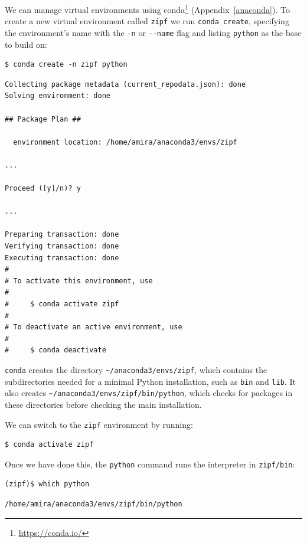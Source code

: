 \documentclass[
]{krantz}
\renewcommand{\href}[2]{#2\footnote{\url{#1}}}
\begin{document}
We can manage virtual environments using \href{https://conda.io/}{conda} (Appendix~\ref{anaconda}).
To create a new virtual environment called \texttt{zipf} we run \texttt{conda\ create},
specifying the environment's name with the \texttt{-n} or \texttt{-\/-name} flag
and listing \texttt{python} as the base to build on:

\begin{verbatim}
$ conda create -n zipf python
\end{verbatim}

\begin{verbatim}
Collecting package metadata (current_repodata.json): done
Solving environment: done

## Package Plan ##

  environment location: /home/amira/anaconda3/envs/zipf

...

Proceed ([y]/n)? y

...

Preparing transaction: done
Verifying transaction: done
Executing transaction: done
#
# To activate this environment, use
#
#     $ conda activate zipf
#
# To deactivate an active environment, use
#
#     $ conda deactivate
\end{verbatim}

\texttt{conda} creates the directory \texttt{\textasciitilde{}/anaconda3/envs/zipf},
which contains the subdirectories needed for a minimal Python installation,
such as \texttt{bin} and \texttt{lib}.
It also creates \texttt{\textasciitilde{}/anaconda3/envs/zipf/bin/python},
which checks for packages in these directories before checking the main installation.

We can switch to the \texttt{zipf} environment by running:

\begin{verbatim}
$ conda activate zipf
\end{verbatim}

Once we have done this,
the \texttt{python} command runs the interpreter in \texttt{zipf/bin}:

\begin{verbatim}
(zipf)$ which python
\end{verbatim}

\begin{verbatim}
/home/amira/anaconda3/envs/zipf/bin/python
\end{verbatim}
\end{document}
